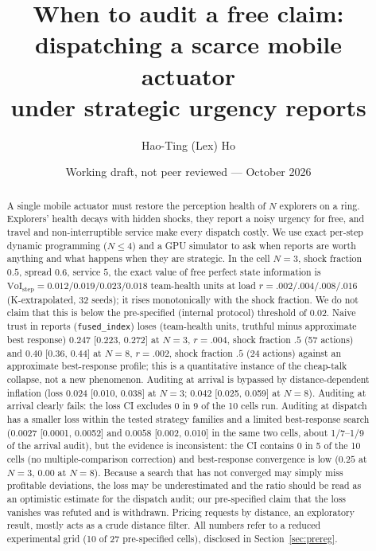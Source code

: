 \documentclass[10pt]{article}
\title{When to audit a free claim: dispatching a scarce mobile actuator\\under strategic urgency reports}
\author{Hao-Ting (Lex) Ho}
\date{Working draft, not peer reviewed --- October 2026}
\begin{document}
\maketitle

\begin{abstract}
A single mobile actuator must restore the perception health of $N$ explorers on a ring. Explorers' health decays with hidden shocks, they report a noisy urgency for free, and travel and non-interruptible service make every dispatch costly. We use exact per-step dynamic programming ($N\le 4$) and a GPU simulator to ask when reports are worth anything and what happens when they are strategic. In the cell $N{=}3$, shock fraction $0.5$, spread $0.6$, service $5$, the exact value of free perfect state information is $\mathrm{VoI}_{\text{step}}=0.012/0.019/0.023/0.018$ team-health units at load $r=.002/.004/.008/.016$ (K-extrapolated, 32 seeds); it rises monotonically with the shock fraction. We do not claim that this is below the pre-specified (internal protocol) threshold of $0.02$. Naive trust in reports (\texttt{fused\_index}) loses (team-health units, truthful minus approximate best response) $0.247$ [0.223, 0.272] at $N{=}3$, $r{=}.004$, shock fraction $.5$ (57 actions) and $0.40$ [0.36, 0.44] at $N{=}8$, $r{=}.002$, shock fraction $.5$ (24 actions) against an approximate best-response profile; this is a quantitative instance of the cheap-talk collapse, not a new phenomenon. Auditing at arrival is bypassed by distance-dependent inflation (loss $0.024$ [0.010, 0.038] at $N{=}3$; $0.042$ [0.025, 0.059] at $N{=}8$). Auditing at arrival clearly fails: the loss CI excludes $0$ in 9 of the 10 cells run. Auditing at dispatch has a smaller loss within the tested strategy families and a limited best-response search ($0.0027$ [0.0001, 0.0052] and $0.0058$ [0.002, 0.010] in the same two cells, about 1/7--1/9 of the arrival audit), but the evidence is inconsistent: the CI contains $0$ in 5 of the 10 cells (no multiple-comparison correction) and best-response convergence is low ($0.25$ at $N{=}3$, $0.00$ at $N{=}8$). Because a search that has not converged may simply miss profitable deviations, the loss may be underestimated and the ratio should be read as an optimistic estimate for the dispatch audit; our pre-specified claim that the loss vanishes was refuted and is withdrawn. Pricing requests by distance, an exploratory result, mostly acts as a crude distance filter. All numbers refer to a reduced experimental grid (10 of 27 pre-specified cells), disclosed in Section~\ref{sec:prereg}.
\end{abstract}
\end{document}
